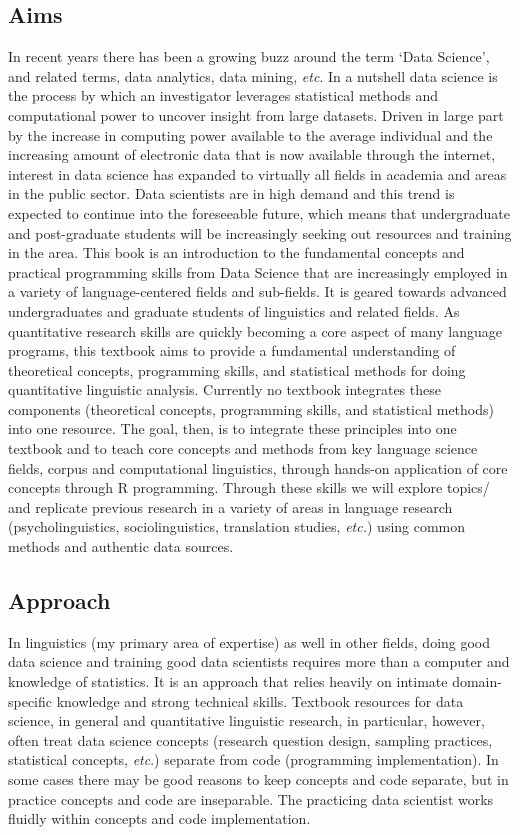 \documentclass[]{book}
\begin{document}
\hypertarget{aims}{%
\subsection{Aims}\label{aims}}

In recent years there has been a growing buzz around the term `Data Science', and related terms, data analytics, data mining, \emph{etc}. In a nutshell data science is the process by which an investigator leverages statistical methods and computational power to uncover insight from large datasets. Driven in large part by the increase in computing power available to the average individual and the increasing amount of electronic data that is now available through the internet, interest in data science has expanded to virtually all fields in academia and areas in the public sector. Data scientists are in high demand and this trend is expected to continue into the foreseeable future, which means that undergraduate and post-graduate students will be increasingly seeking out resources and training in the area.
This book is an introduction to the fundamental concepts and practical programming skills from Data Science that are increasingly employed in a variety of language-centered fields and sub-fields. It is geared towards advanced undergraduates and graduate students of linguistics and related fields. As quantitative research skills are quickly becoming a core aspect of many language programs, this textbook aims to provide a fundamental understanding of theoretical concepts, programming skills, and statistical methods for doing quantitative linguistic analysis. Currently no textbook integrates these components (theoretical concepts, programming skills, and statistical methods) into one resource. The goal, then, is to integrate these principles into one textbook and to teach core concepts and methods from key language science fields, corpus and computational linguistics, through hands-on application of core concepts through R programming. Through these skills we will explore topics/ and replicate previous research in a variety of areas in language research (psycholinguistics, sociolinguistics, translation studies, \emph{etc.}) using common methods and authentic data sources.

\hypertarget{approach}{%
\subsection{Approach}\label{approach}}

In linguistics (my primary area of expertise) as well in other fields, doing good data science and training good data scientists requires more than a computer and knowledge of statistics. It is an approach that relies heavily on intimate domain-specific knowledge and strong technical skills. Textbook resources for data science, in general and quantitative linguistic research, in particular, however, often treat data science concepts (research question design, sampling practices, statistical concepts, \emph{etc}.) separate from code (programming implementation). In some cases there may be good reasons to keep concepts and code separate, but in practice concepts and code are inseparable. The practicing data scientist works fluidly within concepts and code implementation.
\end{document}
